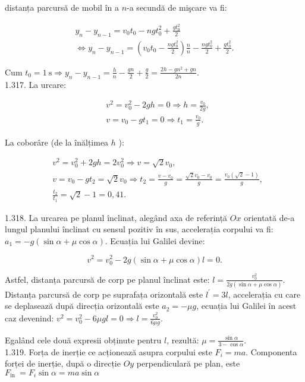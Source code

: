 distanța parcursă de mobil în a $n$-a secundă de mişcare va fi:

$$
\begin{gathered}
y_{n}-y_{n-1}=v_{0} t_{0}-n g t_{0}^{2}+\frac{g t_{0}^{2}}{2} \\
\Leftrightarrow y_{n}-y_{n-1}=\left(v_{0} t_{0}-\frac{n g t_{0}^{2}}{2}\right) \frac{n}{n}-\frac{n g t_{0}^{2}}{2}+\frac{g t_{0}^{2}}{2} .
\end{gathered}
$$

Cum $t_{0}=1 \mathrm{~s} \Rightarrow y_{n}-y_{n-1}=\frac{h}{n}-\frac{g n}{2}+\frac{g}{2}=\frac{2 h-g n^{2}+g n}{2 n}$.\\
1.317. La urcare:

$$
\begin{aligned}
& v^{2}=v_{0}^{2}-2 g h=0 \Rightarrow h=\frac{v_{0}}{2 g}, \\
& v=v_{0}-g t_{1}=0 \Rightarrow t_{1}=\frac{v_{0}}{g} .
\end{aligned}
$$

La coborâre (de la înălțimea $h$ ):

$$
\begin{aligned}
& v^{2}=v_{0}^{2}+2 g h=2 v_{0}^{2} \Rightarrow v=\sqrt{2} v_{0}, \\
& v=v_{0}-g t_{2}=\sqrt{2} v_{0} \Rightarrow t_{2}=\frac{v-v_{0}}{g}=\frac{\sqrt{2} v_{0}-v_{0}}{g}=\frac{v_{0}(\sqrt{2}-1)}{g}, \\
& \frac{t_{2}}{t_{1}}=\sqrt{2}-1=0,41 .
\end{aligned}
$$

1.318. La urcarea pe planul înclinat, alegând axa de referință $O x$ orientată de-a lungul planului înclinat cu sensul pozitiv în sus, accelerația corpului va fi: $a_{1}=-g(\sin \alpha+\mu \cos \alpha)$. Ecuația lui Galilei devine:

$$
v^{2}=v_{0}^{2}-2 g(\sin \alpha+\mu \cos \alpha) l=0 .
$$

Astfel, distanța parcursă de corp pe planul înclinat este: $l=\frac{v_{0}^{2}}{2 g(\sin \alpha+\mu \cos \alpha)}$.\\
Distanța parcursă de corp pe suprafața orizontală este $l^{\prime}=3 l$, accelerația cu care se deplasează după direcția orizontală este $a_{2}=-\mu g$, ecuația lui Galilei în acest caz devenind: $v^{2}=v_{0}^{2}-6 \mu g l=0 \Rightarrow l=\frac{v_{0}^{2}}{6 \mu g}$.

Egalând cele două expresii obținute pentru $l$, rezultă: $\mu=\frac{\sin \alpha}{3-\cos \alpha}$.\\
1.319. Forța de inerție ce acționează asupra corpului este $F_{i}=m a$. Componenta forței de inerție, după o direcție $O y$ perpendiculară pe plan, este $F_{\text {in }}=F_{i} \sin \alpha=m a \sin \alpha$

